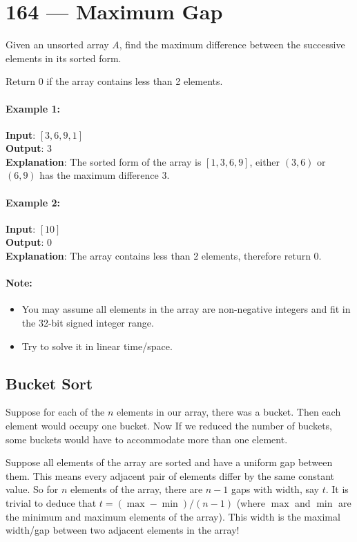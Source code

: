 \section{164 --- Maximum Gap}
Given an unsorted array $A$, find the maximum difference between the successive elements in its sorted form.
\par
Return 0 if the array contains less than 2 elements.
\paragraph{Example 1:}
\begin{flushleft}
\textbf{Input}: $[3,6,9,1]$
\\
\textbf{Output}: 3
\\
\textbf{Explanation}: The sorted form of the array is $[1,3,6,9]$, either $(3,6)$ or $(6,9)$ has the maximum difference 3.
\end{flushleft}
\paragraph{Example 2:}
\begin{flushleft}
\textbf{Input}: $[10]$
\\
\textbf{Output}: 0
\\
\textbf{Explanation}: The array contains less than 2 elements, therefore return 0.
\end{flushleft}
\paragraph{Note:}
\begin{itemize}
    \item You may assume all elements in the array are non-negative integers and fit in the 32-bit signed integer range.
    \item Try to solve it in linear time/space.
\end{itemize}


\subsection{Bucket Sort}
Suppose for each of the $n$ elements in our array, there was a bucket. Then each element would occupy one bucket. Now If we reduced the number of buckets, some buckets would have to accommodate more than one element.

Suppose all elements of the array are sorted and have a uniform gap between them. This means every adjacent pair of elements differ by the same constant value. So for $n$ elements of the array, there are $n−1$ gaps with width, say $t$. It is trivial to deduce that $t=(\max−\min)/(n−1)$ (where $\max$ and $\min$ are the minimum and maximum elements of the array). This width is the maximal width/gap between two adjacent elements in the array!

